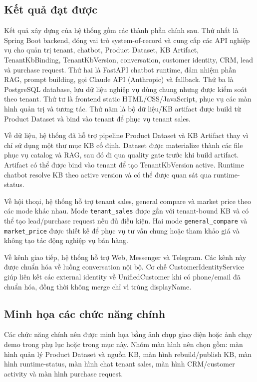 \documentclass[../DoAn.tex]{subfiles}
\begin{document}
\subsection{Kết quả đạt được}
\label{subsection:4.3.2}

Kết quả xây dựng của hệ thống gồm các thành phần chính sau. Thứ nhất là Spring Boot backend, đóng vai trò system-of-record và cung cấp các API nghiệp vụ cho quản trị tenant, chatbot, Product Dataset, KB Artifact, TenantKbBinding, TenantKbVersion, conversation, customer identity, CRM, lead và purchase request. Thứ hai là FastAPI chatbot runtime, đảm nhiệm phần RAG, prompt building, gọi Claude API (Anthropic) và fallback. Thứ ba là PostgreSQL database, lưu dữ liệu nghiệp vụ dùng chung nhưng được kiểm soát theo tenant. Thứ tư là frontend static HTML/CSS/JavaScript, phục vụ các màn hình quản trị và tương tác. Thứ năm là bộ dữ liệu/KB artifact được build từ Product Dataset và bind vào tenant để phục vụ tenant sales.

Về dữ liệu, hệ thống đã hỗ trợ pipeline Product Dataset và KB Artifact thay vì chỉ sử dụng một thư mục KB cố định. Dataset được materialize thành các file phục vụ catalog và RAG, sau đó đi qua quality gate trước khi build artifact. Artifact có thể được bind vào tenant để tạo TenantKbVersion active. Runtime chatbot resolve KB theo active version và có thể được quan sát qua runtime-status.

Về hội thoại, hệ thống hỗ trợ tenant sales, general compare và market price theo các mode khác nhau. Mode \texttt{tenant\_sales} được gắn với tenant-bound KB và có thể tạo lead/purchase request nếu đủ điều kiện. Hai mode \texttt{general\_compare} và \texttt{market\_price} được thiết kế để phục vụ tư vấn chung hoặc tham khảo giá và không tạo tác động nghiệp vụ bán hàng.

Về kênh giao tiếp, hệ thống hỗ trợ Web, Messenger và Telegram. Các kênh này được chuẩn hóa về luồng conversation nội bộ. Cơ chế CustomerIdentityService giúp liên kết các external identity về UnifiedCustomer khi có phone/email đã chuẩn hóa, đồng thời không merge chỉ vì trùng displayName.

\subsection{Minh họa các chức năng chính}
\label{subsection:4.3.3}

Các chức năng chính nên được minh họa bằng ảnh chụp giao diện hoặc ảnh chạy demo trong phụ lục hoặc trong mục này. Nhóm màn hình nên chọn gồm: màn hình quản lý Product Dataset và nguồn KB, màn hình rebuild/publish KB, màn hình runtime-status, màn hình chat tenant sales, màn hình CRM/customer activity và màn hình purchase request.
\end{document}
